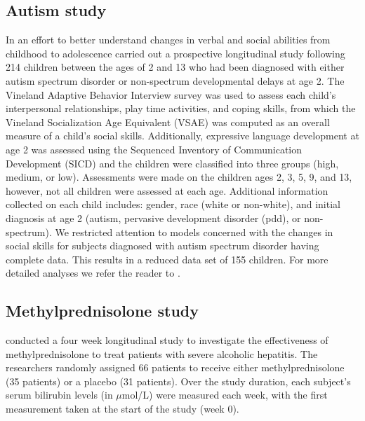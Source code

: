 \documentclass[12pt]{article} %
\newcommand{\alnote}[1]{\todo[inline,color=green!40]{#1}} %
\begin{document}
\subsection{Autism study}\label{data:autism}
In an effort to better understand changes in verbal and social abilities from childhood to adolescence \cite{Anderson:2007cl, Anderson:2009in} carried out a prospective longitudinal study following 214 children between the ages of 2 and 13 who had been diagnosed with either autism spectrum disorder or non-spectrum developmental delays at age 2. The Vineland Adaptive Behavior Interview survey was used to assess each child's interpersonal relationships, play time activities, and coping skills, 
from which the Vineland Socialization Age Equivalent (VSAE) was computed as an overall measure of a child's social skills. Additionally, expressive language development at age 2 was assessed using the Sequenced Inventory of Communication Development (SICD) and the children were classified into three groups (high, medium, or low). Assessments were made on the children ages 2, 3, 5, 9, and 13, however, not all children were assessed at each age. Additional information collected on each child includes: gender, race (white or non-white), and initial diagnosis at age 2 (autism, pervasive development disorder (pdd), or non-spectrum). We restricted attention to models concerned with the changes in social skills for subjects diagnosed with autism spectrum disorder having complete data. This results in a reduced data set of 155 children. For more detailed analyses we refer the reader to \cite{Anderson:2007cl, Anderson:2009in}.

\subsection{Methylprednisolone study}\label{data:ahd}

\cite{Carithers:1989} conducted a four week longitudinal study to investigate the effectiveness of methylprednisolone to treat patients with severe alcoholic hepatitis. The researchers randomly assigned 66 patients to receive either methylprednisolone (35 patients) or a placebo (31 patients). Over the study duration, each subject's serum bilirubin levels (in $\mu$mol/L) were measured each week, with the first measurement taken at the start of the study (week 0).
\end{document}
